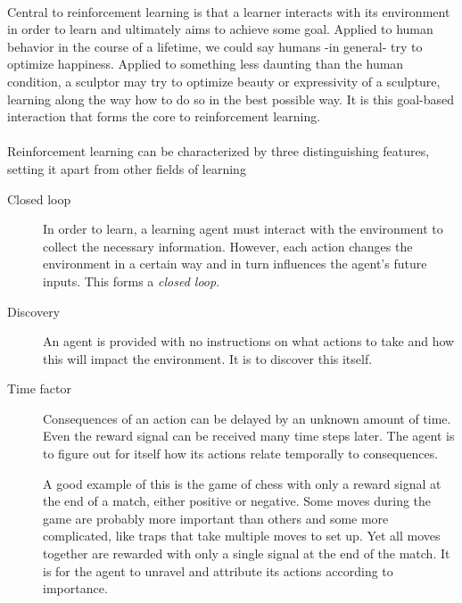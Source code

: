 \paragraph{}
Central to reinforcement learning is that a learner
interacts with its environment in order to learn
and ultimately aims to achieve some goal.
Applied to human behavior in the course of a lifetime,
we could say humans -in general- try to optimize happiness.
Applied to something less daunting than the human condition,
a sculptor may try to optimize beauty
or expressivity of a sculpture,
learning along the way how to do so in the best possible way.
It is this goal-based interaction that forms the core
to reinforcement learning.

\paragraph{}
Reinforcement learning can be characterized
by three distinguishing features,
setting it apart from other fields of learning

\begin{description}
  \item[Closed loop]
    In order to learn, a learning agent must interact
    with the environment to collect the necessary information.
    However, each action changes the environment in a certain way
    and in turn influences the agent's future inputs.
    This forms a \textit{closed loop}.

  \item[Discovery]
    An agent is provided with no instructions on what actions to take
    and how this will impact the environment.
    It is to discover this itself.

  \item[Time factor]
    Consequences of an action can be delayed by an unknown amount of time.
    Even the reward signal can be received many time steps later.
    The agent is to figure out for itself
    how its actions relate temporally to consequences.

    A good example of this is the game of chess with only a reward signal
    at the end of a match, either positive or negative.
    Some moves during the game are probably more important
    than others and some more complicated,
    like traps that take multiple moves to set up.
    Yet all moves together are rewarded with only a single signal
    at the end of the match.
    It is for the agent to unravel and attribute
    its actions according to importance.
\end{description}

